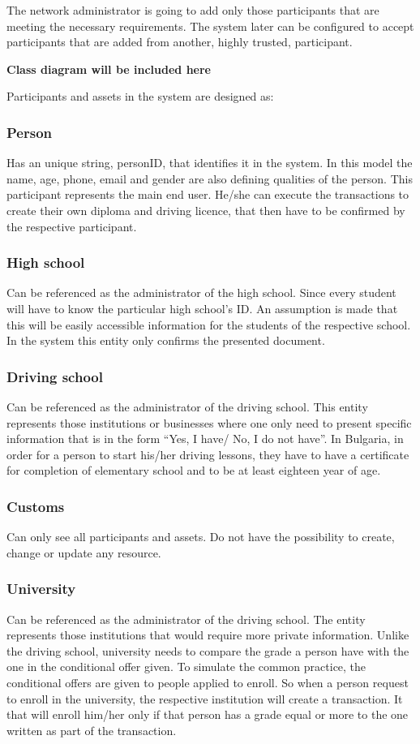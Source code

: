 \documentclass[a4paper,11pt]{report}
\begin{document}
The network administrator is going to add only those participants that are meeting the necessary requirements. The system later can be configured to accept participants that are added from another, highly trusted, participant.  

\textbf{Class diagram will be included here} 

Participants and assets in the system are designed as:

\subsubsection{Person}
Has an unique string, personID, that identifies it in the system. In this model the name, age, phone, email and gender are also defining qualities of the person. This participant represents the main end user. He/she can execute the transactions to create their own diploma and driving licence, that then have to be confirmed by the respective participant.   

\subsubsection{High school}
Can be referenced as the administrator of the high school. Since every student will have to know the particular high school's ID. An assumption is made that this will be easily accessible information for the students of the respective school. In the system this entity only confirms the presented document. 

\subsubsection{Driving school}	
Can be referenced as the administrator of the driving school. This entity represents those institutions or businesses where one only need to present specific information that is in the form “Yes, I have/ No, I do not have”. In Bulgaria, in order for a person to start his/her driving lessons, they have to have a certificate for completion of elementary school and to be at least eighteen year of age. 
	
\subsubsection{Customs}
Can only see all participants and assets. Do not have the possibility to create, change or update any resource.  

\subsubsection{University}
Can be referenced as the administrator of the driving school. The entity represents those institutions that would require more private information. Unlike the driving school, university needs to compare the grade a person have with the one in the conditional offer given. To simulate the common practice, the conditional offers are given to people applied to enroll. So when a person request to enroll in the university, the respective institution will create a transaction. It that will enroll him/her only if that person has a grade equal or more to the one written as part of the transaction. 
	
\end{document}
